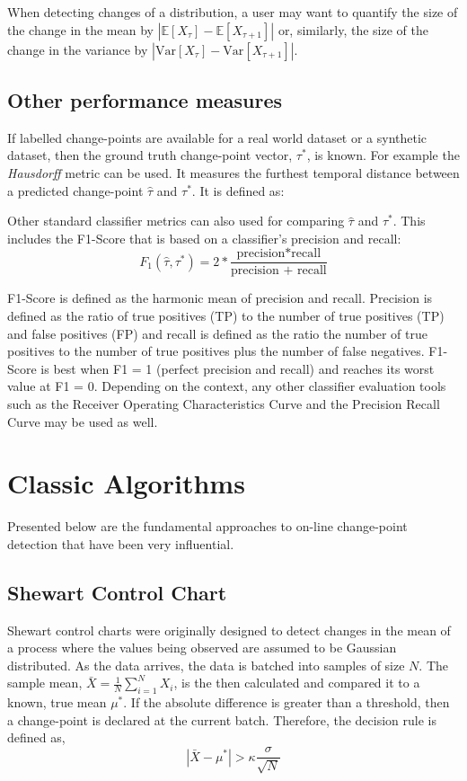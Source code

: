 When detecting changes of a distribution, a user may want to quantify the size of the change in the mean by
$|\mathbb{E}[X_{\tau}]-\mathbb{E}[X_{\tau+1}]|$ or, similarly, the size of the change in the variance by $|\text{Var}[X_{\tau}]-\text{Var}[X_{\tau+1}]|$.

\subsection{Other performance measures}

If labelled change-points are available for a real world dataset or a synthetic dataset, then the ground truth change-point vector, $\tau^*$, is known. For example the \textit{Hausdorff} metric can be used. It measures the furthest temporal distance between a predicted change-point $\hat{\tau}$ and $\tau^*$. It is defined as:

Other standard classifier metrics can also used for comparing $\hat{\tau}$ and $\tau^*$. This includes the  F1-Score that is based on a classifier's precision and recall:
\begin{equation}
F_1(\hat{\tau}, \tau^*) = 2 * \frac{\text{precision*recall}}{\text{precision + recall}}
\end{equation}

 F1-Score is defined as the harmonic mean of precision and recall. Precision is defined as the ratio of true positives (TP) to the
number of true positives (TP) and false positives (FP) and recall is defined as the ratio the number of true positives to the
number of true positives plus the number of false negatives. F1-Score is best when F1 = 1 (perfect precision and recall) and reaches its worst value at F1 = 0. Depending on the context, any other classifier evaluation tools such as the Receiver Operating Characteristics Curve and the Precision Recall Curve may be used as well.

\section{Classic Algorithms}
Presented below are the fundamental approaches to on-line change-point detection that have been very influential. 

\subsection{Shewart Control Chart}
Shewart control charts were originally designed to detect changes in the mean of a process where the values being observed are assumed to be Gaussian distributed. As the data arrives, the data is batched into samples of size $N$.  The sample mean, $\bar{X}=\frac{1}{N} \sum_{i=1}^N X_i$, is the then calculated and compared it to a known, true mean $\mu^*$. If the absolute difference is greater than a threshold, then a change-point is declared at the current batch. Therefore, the decision rule is defined as,
\begin{equation}
|\bar{X}-\mu^*| > \kappa \frac{\sigma}{\sqrt{N}}
\end{equation}

